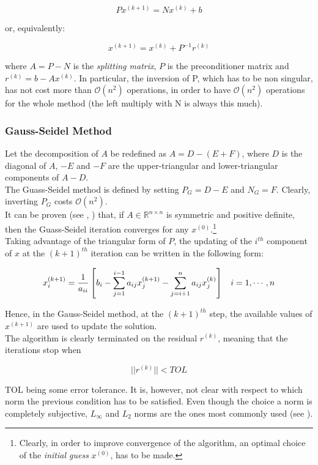 \documentclass{article}
\theoremstyle{theorem}
\theoremstyle{definition}
\begin{document}
$$Px^{(k+1)}=Nx^{(k)}+b$$

or, equivalently:

$$x^{(k+1)}=x^{(k)}+P^{-1}r^{(k)}$$

where $A=P-N$ is the \emph{splitting matrix}, $P$ is the preconditioner matrix and $r^{(k)}=b-Ax^{(k)}$. In particular, the inversion of
P, which has to be non singular, has not cost more than $\mathcal{O}(n^2)$ operations, in order to have $\mathcal{O}(n^2)$ operations for the whole method (the left multiply with N is always this much).\\

\subsubsection{Gauss-Seidel Method}
Let the decomposition of $A$ be redefined as $A=D-(E+F)$, where $D$ is the diagonal of $A$, $-E$ and $-F$ are the upper-triangular and lower-triangular components of $A-D$.\\
The Guass-Seidel method is defined by setting $P_G=D-E$ and $N_G=F$. Clearly, inverting $P_G$ costs $\mathcal{O}(n^2)$.\\
It can be proven (see \cite{lec-notes}, \cite{hac94}) that, if $A\in\mathbb{R}^{n\times n}$ is symmetric and positive definite, then the Guass-Seidel iteration converges for any $x^{(0)}$.\footnote{Clearly, in order to improve convergence of the algorithm, an optimal choice of the \emph{initial guess} $x^{(0)}$, has to be made. }\\
Taking advantage of the triangular form of $P$, the updating of the $i^{th}$ component of $x$ at the $(k+1)^{th}$ iteration can be written in the following form:

$$x_i^{(k+1)}=\frac{1}{a_{ii}}\left[b_i-\sum_{j=1}^{i-1}a_{ij}x_j^{(k+1)}-\sum_{j=i+1}^{n}a_{ij}x_j^{(k)}\right]\hspace{3mm} i=1,\cdots, n$$

Hence, in the Gauss-Seidel method, at the $(k+1)^{th}$ step, the available values of $x^{(k+1)}$ are used to update the solution.\\
The algorithm is clearly terminated on the residual $r^{(k)}$, meaning that the iterations stop when

$$||r^{(k)}||<TOL$$

TOL being some error tolerance. It is, however, not clear with respect to which norm the previous condition has to be satisfied. Even though the choice a norm is completely subjective, $L_\infty$ and $L_2$ norms are the ones most commonly used (see \cite{lec-notes}). 
\end{document}
